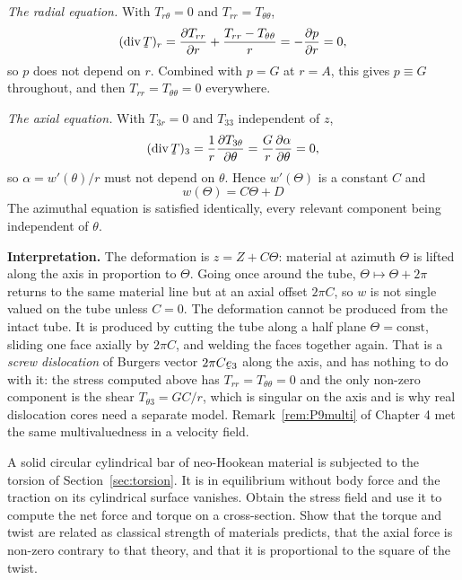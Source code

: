 \begin{solution}
\emph{The radial equation.} With $T_{r\theta}=0$ and
$T_{rr}=T_{\theta\theta}$,
\[
   (\dvg\bT)_{r}=\frac{\partial T_{rr}}{\partial r}
   +\frac{T_{rr}-T_{\theta\theta}}{r}
   =-\frac{\partial p}{\partial r}=0 ,
\]
so $p$ does not depend on $r$. Combined with $p=G$ at $r=A$, this gives
$p\equiv G$ throughout, and then $T_{rr}=T_{\theta\theta}=0$ everywhere.

\emph{The axial equation.} With $T_{3r}=0$ and $T_{33}$ independent of
$z$,
\[
   (\dvg\bT)_{3}=\frac{1}{r}\frac{\partial T_{3\theta}}{\partial\theta}
   =\frac{G}{r}\frac{\partial\alpha}{\partial\theta}=0 ,
\]
so $\alpha=w'(\theta)/r$ must not depend on $\theta$. Hence
$w'(\Theta)$ is a constant $C$ and
\[
   \boxed{\;w(\Theta)=C\Theta+D\;}
\]
The azimuthal equation is satisfied identically, every relevant
component being independent of $\theta$.

\textbf{Interpretation.} The deformation is $z=Z+C\Theta$: material at
azimuth $\Theta$ is lifted along the axis in proportion to $\Theta$.
Going once around the tube, $\Theta\mapsto\Theta+2\pi$ returns to the
same material line but at an axial offset $2\pi C$, so $w$ is not single
valued on the tube unless $C=0$. The deformation cannot be produced from
the intact tube. It is produced by cutting the tube along a half plane
$\Theta=\text{const}$, sliding one face axially by $2\pi C$, and welding
the faces together again. That is a \emph{screw dislocation} of Burgers
vector $2\pi C\be_{3}$ along the axis, and  has nothing to do
with it: the stress computed above has $T_{rr}=T_{\theta\theta}=0$ and
the only non-zero component is the shear $T_{\theta3}=GC/r$, which is
singular on the axis and is why real dislocation cores need a separate
model. Remark~\ref{rem:P9multi} of Chapter 4 met the same
multivaluedness in a velocity field.
\end{solution}

\begin{problem}
A solid circular cylindrical bar of neo-Hookean material is subjected to
the torsion of Section~\ref{sec:torsion}. It is in equilibrium without
body force and the traction on its cylindrical surface vanishes. Obtain
the stress field and use it to compute the net force and torque on a
cross-section. Show that the torque and twist are related as classical
strength of materials predicts, that the axial force is non-zero
contrary to that theory, and that it is proportional to the square of
the twist.
\end{problem}


